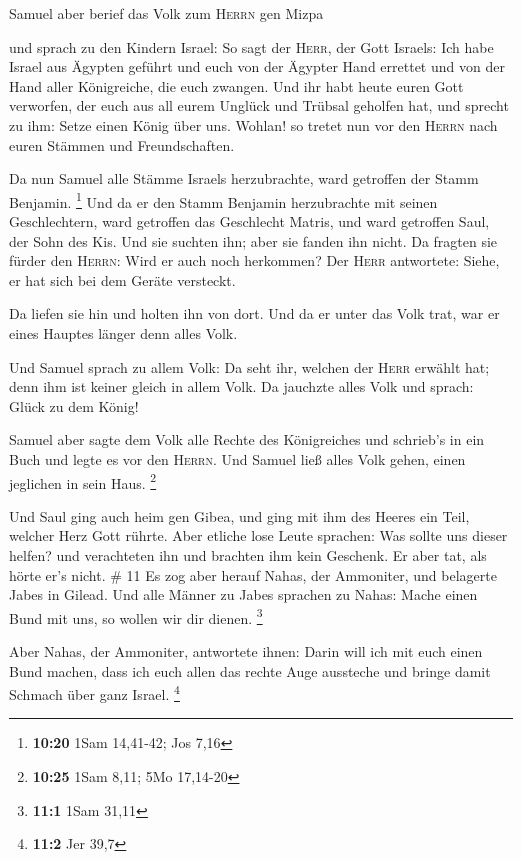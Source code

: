  Samuel aber berief das Volk zum \textsc{Herrn} gen Mizpa

 und sprach zu den Kindern Israel: So sagt der
\textsc{Herr}, der Gott Israels: Ich habe Israel aus Ägypten geführt und
euch von der Ägypter Hand errettet und von der Hand aller Königreiche,
die euch zwangen.  Und ihr habt heute euren Gott
verworfen, der euch aus all eurem Unglück und Trübsal geholfen hat, und
sprecht zu ihm: Setze einen König über uns. Wohlan! so tretet nun vor
den \textsc{Herrn} nach euren Stämmen und Freundschaften.

 Da nun Samuel alle Stämme Israels herzubrachte, ward
getroffen der Stamm Benjamin. \footnote{\textbf{10:20} 1Sam 14,41-42;
  Jos 7,16}  Und da er den Stamm Benjamin herzubrachte
mit seinen Geschlechtern, ward getroffen das Geschlecht Matris, und ward
getroffen Saul, der Sohn des Kis. Und sie suchten ihn; aber sie fanden
ihn nicht.  Da fragten sie fürder den \textsc{Herrn}:
Wird er auch noch herkommen? Der \textsc{Herr} antwortete: Siehe, er hat
sich bei dem Geräte versteckt.

 Da liefen sie hin und holten ihn von dort. Und da er
unter das Volk trat, war er eines Hauptes länger denn alles Volk.

 Und Samuel sprach zu allem Volk: Da seht ihr, welchen
der \textsc{Herr} erwählt hat; denn ihm ist keiner gleich in allem Volk.
Da jauchzte alles Volk und sprach: Glück zu dem König!

 Samuel aber sagte dem Volk alle Rechte des Königreiches
und schrieb's in ein Buch und legte es vor den \textsc{Herrn}. Und
Samuel ließ alles Volk gehen, einen jeglichen in sein Haus. \footnote{\textbf{10:25}
  1Sam 8,11; 5Mo 17,14-20}

 Und Saul ging auch heim gen Gibea, und ging mit ihm des
Heeres ein Teil, welcher Herz Gott rührte.  Aber etliche
lose Leute sprachen: Was sollte uns dieser helfen? und verachteten ihn
und brachten ihm kein Geschenk. Er aber tat, als hörte er's nicht. \# 11
 Es zog aber herauf Nahas, der Ammoniter, und belagerte
Jabes in Gilead. Und alle Männer zu Jabes sprachen zu Nahas: Mache einen
Bund mit uns, so wollen wir dir dienen. \footnote{\textbf{11:1} 1Sam
  31,11}

 Aber Nahas, der Ammoniter, antwortete ihnen: Darin will
ich mit euch einen Bund machen, dass ich euch allen das rechte Auge
aussteche und bringe damit Schmach über ganz Israel. \footnote{\textbf{11:2}
  Jer 39,7}


